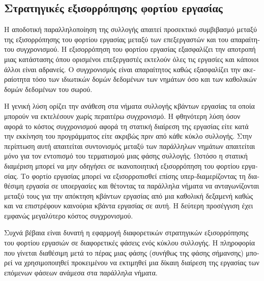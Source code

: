 \begin{greek}
\subsection{Στρατηγικές εξισορρόπησης φορτίου εργασίας}
Η αποδοτική παραλληλοποίηση της συλλογής απαιτεί προσεκτικό
συμβιβασμό μεταξύ της εξισορρόπησης του φορτίου εργασίας
μεταξύ των επεξεργαστών και του απαραίτητου συγχρονισμού.
Η εξισορρόπηση του φορτίου εργασίας εξασφαλίζει την αποτροπή
μιας κατάστασης όπου ορισμένοι επεξεργαστές εκτελούν όλες
τις εργασίες και κάποιοι άλλοι είναι αδρανείς. Ο συγχρονισμός
είναι απαραίτητος καθώς εξασφαλίζει την ακεραίοτητα τόσο των
ιδιωτικών δομών δεδομένων των νημάτων όσο και των καθολικών
δομών δεδομένων του σωρού.
 
Η γενική λύση ορίζει την ανάθεση στα νήματα συλλογής κβάντων
εργασίας τα οποία μπορούν να εκτελέσουν χωρίς περαιτέρω
συγχρονισμό. Η φθηνότερη λύση όσον αφορά το κόστος συγχρονισμού
αφορά τη στατική διαίρεση της εργασίας είτε κατά την εκκίνηση
του προγράμματος είτε ακριβώς πριν από κάθε κύκλο συλλογής.
Στην περίπτωση αυτή απαιτείται συντονισμός μεταξύ των παράλληλων
νημάτων απαιτείται μόνο για τον εντοπισμό του τερματισμού μιας
φάσης συλλογής. Ωστόσο η στατική διαμέριση μπορεί να μην οδηγήσει
σε ικανοποιητική εξισορρόπηση του φορτίου εργασίας. Το φορτίο
εργασίας μπορεί να εξισορροπισθεί επίσης υπερ-διαμερίζοντας
τη διαθέσιμη εργασία σε υποεργασίες και θέτοντας τα παράλληλα
νήματα να ανταγωνίζονται μεταξύ τους για την απόκτηση κβάντων
εργασίας από μια καθολική δεξαμενή καθώς και να επιστρέφουν
καινούρια κβάντα εργασίας σε αυτή. Η δεύτερη προσέγγιση έχει
εμφανώς μεγαλύτερο κόστος συγχρονισμού.

Συχνά βέβαια είναι δυνατή η εφαρμογή διαφορετικών στρατηγικών
εξισορρόπησης του φορτίου εργασιών σε διαφορετικές φάσεις ενός
κύκλου συλλογής. Η πληροφορία που γίνεται διαθέσιμη μετά το
πέρας μιας φάσης (συνήθως της φάσης σήμανσης) μπορεί να χρησιμοποιηθεί
προκειμένου να εκτιμηθεί μια δίκαιη διαίρεση της εργασίας των
επόμενων φάσεων ανάμεσα στα παράλληλα νήματα.
 

\end{greek}
